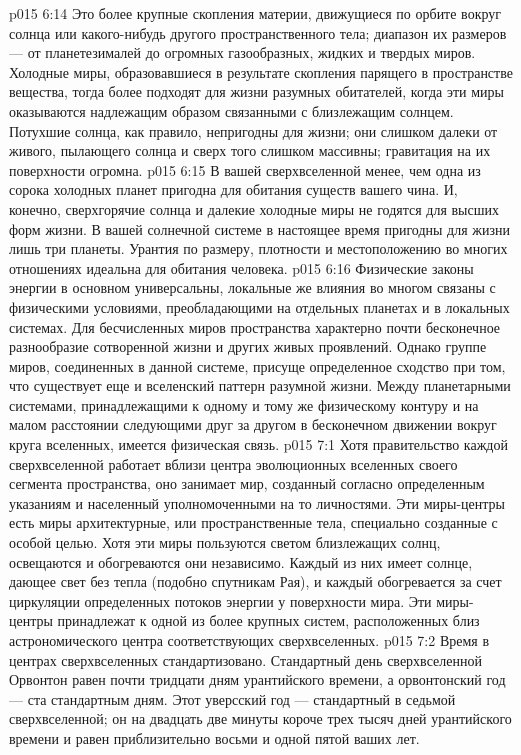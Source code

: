 \vs p015 6:14 \pc {} Это более крупные скопления материи, движущиеся по орбите вокруг солнца или какого\hyp{}нибудь другого пространственного тела; диапазон их размеров --- от планетезималей до огромных газообразных, жидких и твердых миров. Холодные миры, образовавшиеся в результате скопления парящего в пространстве вещества, тогда более подходят для жизни разумных обитателей, когда эти миры оказываются надлежащим образом связанными с близлежащим солнцем. Потухшие солнца, как правило, непригодны для жизни; они слишком далеки от живого, пылающего солнца и сверх того слишком массивны; гравитация на их поверхности огромна.
\vs p015 6:15 В вашей сверхвселенной менее, чем одна из сорока холодных планет пригодна для обитания существ вашего чина. И, конечно, сверхгорячие солнца и далекие холодные миры не годятся для высших форм жизни. В вашей солнечной системе в настоящее время пригодны для жизни лишь три планеты. Урантия по размеру, плотности и местоположению во многих отношениях идеальна для обитания человека.
\vs p015 6:16 Физические законы энергии в основном универсальны, локальные же влияния во многом связаны с физическими условиями, преобладающими на отдельных планетах и в локальных системах. Для бесчисленных миров пространства характерно почти бесконечное разнообразие сотворенной жизни и других живых проявлений. Однако группе миров, соединенных в данной системе, присуще определенное сходство при том, что существует еще и вселенский паттерн разумной жизни. Между планетарными системами, принадлежащими к одному и тому же физическому контуру и на малом расстоянии следующими друг за другом в бесконечном движении вокруг круга вселенных, имеется физическая связь.
\vs p015 7:1 Хотя правительство каждой сверхвселенной работает вблизи центра эволюционных вселенных своего сегмента пространства, оно занимает мир, созданный согласно определенным указаниям и населенный уполномоченными на то личностями. Эти миры\hyp{}центры есть миры архитектурные, или пространственные тела, специально созданные с особой целью. Хотя эти миры пользуются светом близлежащих солнц, освещаются и обогреваются они независимо. Каждый из них имеет солнце, дающее свет без тепла (подобно спутникам Рая), и каждый обогревается за счет циркуляции определенных потоков энергии у поверхности мира. Эти миры\hyp{}центры принадлежат к одной из более крупных систем, расположенных близ астрономического центра соответствующих сверхвселенных.
\vs p015 7:2 \pc Время в центрах сверхвселенных стандартизовано. Стандартный день сверхвселенной Орвонтон равен почти тридцати дням урантийского времени, а орвонтонский год --- ста стандартным дням. Этот уверсский год --- стандартный в седьмой сверхвселенной; он на двадцать две минуты короче трех тысяч дней урантийского времени и равен приблизительно восьми и одной пятой ваших лет.

